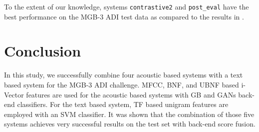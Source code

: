 \documentclass{article}
\begin{document}
\vspace{-7pt}
\begin{table}[h]\caption{The performance of the system submissions on MGB-3 test set with different set combinations for back-end and system fusion trainings.}\label{tab:subperf}
\vspace{5pt}
\centering
{}
\end{table}

\noindent To the extent of our knowledge, systems \texttt{contrastive2} and \texttt{post\_eval} have the best performance on the MGB-3 ADI test data as compared to the results in \cite{zampieri2017vardial17, Ali2017mgb3}.


\section{Conclusion}
\label{sec:conclude}

In this study, we successfully combine four acoustic based systems with a text based system for the MGB-3 ADI challenge. MFCC, BNF, and UBNF based i-Vector features are used for the acoustic based systems with GB and GANs back-end classifiers. For the text based system, TF based unigram features are employed with an SVM classifier. It was shown that the combination of those five systems achieves very successful results on the test set with back-end score fusion.





\end{document}
